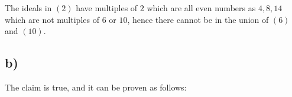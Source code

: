 \documentclass[unicode,11pt,a4paper,oneside,numbers=endperiod,openany]{scrartcl}
\begin{document}
The ideals in \( (2) \) have multiples of \( 2 \) which are all even numbers as \( 4, 8, 14 \) 
which are not multiples of \( 6 \) or \( 10 \),
hence there cannot be in the union of \( (6) \) and \( (10) \).


\subsection*{b)}

The claim is true, and it can be proven as follows:
\end{document}
